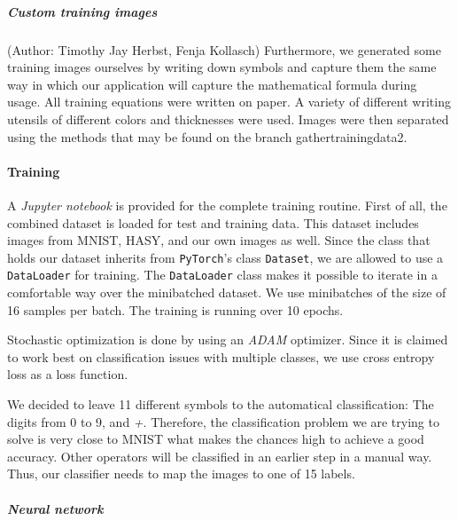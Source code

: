 \documentclass[12pt]{article}
\begin{document}
		\subparagraph{Custom training images}	\small{(Author: Timothy Jay Herbst, Fenja Kollasch)}
		Furthermore, we generated some training images ourselves by writing down symbols and capture them the same way in which our application will capture the mathematical formula during usage.
		All training equations were written on paper.
		A variety of different writing utensils of different colors and thicknesses were used.
		Images were then separated using the methods that may be found on the branch gathertrainingdata2. %
		
		
	\paragraph{Training}
		A \textit{Jupyter notebook} is provided for the complete training routine. First of all, the combined dataset is loaded for test and training data. This dataset includes images from MNIST, HASY, and our own images as well. Since the class that holds our dataset inherits from \texttt{PyTorch}'s class \texttt{Dataset}, we are allowed to use a \texttt{DataLoader} for training. The \texttt{DataLoader} class makes it possible to iterate in a comfortable way over the minibatched dataset. We use minibatches of the size of 16 samples per batch. The training is running over 10 epochs.
		
		Stochastic optimization is done by using an \textit{ADAM}\cite{adam} optimizer. Since it is claimed to work best on classification issues with multiple classes, we use cross entropy loss as a loss function.
		
		We decided to leave 11 different symbols to the automatical classification: The digits from 0 to 9,  and \textit{+}. Therefore, the classification problem we are trying to solve is very close to MNIST what makes the chances high to achieve a good accuracy. Other operators will be classified in an earlier step in a manual way. Thus, our classifier needs to map the images to one of 15 labels.
				
		\subparagraph{Neural network}
		
\end{document}
